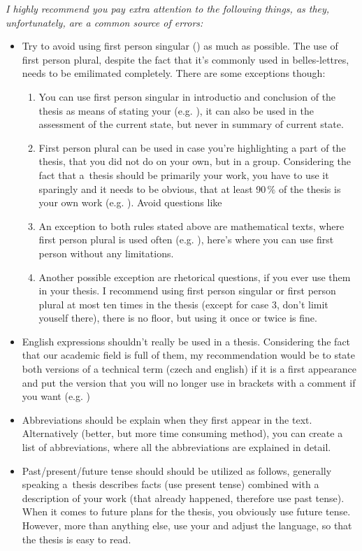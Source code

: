 \it I highly recommend you pay extra attention to the following things, as they, unfortunately, are a common source of errors:
\begin{itemize}
  \item{Try to avoid using first person singular () as much as possible. The use of first person plural, despite the fact that it's commonly used in belles-lettres, needs to be emilimated completely. There are some exceptions though:
    \begin{enumerate}
      \item{You can use first person singular in introductio and conclusion of the thesis as means of stating your  (e.g. ), it can also be used in the assessment of the current state, but never in summary of current state.}
      \item{First person plural can be used in case you're highlighting a part of the thesis, that you did not do on your own, but in a group. Considering the fact that a~thesis should be primarily your work, you have to use it sparingly and it needs to be obvious, that at least 90\,\% of the thesis is your own work (e.g. ). Avoid questions like }
      \item{An exception to both rules stated above are mathematical texts, where first person plural is used often (e.g. ), here's where you can use first person without any limitations.}
      \item{Another possible exception are rhetorical questions, if you ever use them in your thesis. I  recommend using first person singular or first person plural at most ten times in the thesis (except for case 3, don't limit youself there), there is no floor, but using it once or twice is fine.}
    \end{enumerate}}
  \item{English expressions shouldn't really be used in a thesis. Considering the fact that our academic field is full of them, my recommendation would be to state both versions of a technical term (czech and english) if it is a first appearance and put the version that you will no longer use in brackets with a comment if you want (e.g. )}
  \item{Abbreviations should be explain when they first appear in the text. Alternatively (better, but more time consuming method), you can create a list of abbreviations, where all the abbreviations are explained in detail.}
  \item{Past/present/future tense should should be utilized as follows, generally speaking a~thesis describes facts (use present tense) combined with a description of your work (that already happened, therefore use past tense). When it comes to future plans for the thesis, you obviously use future tense. However, more than anything else, use your  and adjust the language, so that the thesis is easy to read.}
\end{itemize}
